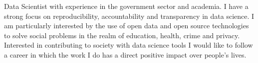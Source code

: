 %
%
%
\par{
Data Scientist with experience in the government sector and academia. I have a strong focus on reproducibility, accountability and transparency in data science. I am particularly interested by the use of open data and open source technologies to solve social problems in the realm of education, health, crime and privacy. Interested in contributing to society with data science tools I would like to follow a career in which the work I do has a direct positive impact over people's lives.
}